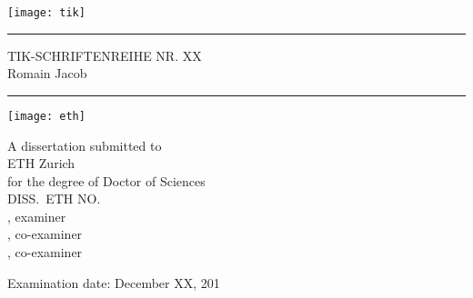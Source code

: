 
\thispagestyle{empty}
\noindent\texttt{[image: tik]}
\medskip
\hrule
\begin{flushright}
\vspace{0.5cm}
TIK-SCHRIFTENREIHE NR. XX \\ \vspace{1cm} 
\large Romain Jacob \\ \vspace{1cm}
\end{flushright}
\begin{flushright}
\Large\bfseries
\titlestringNOBR
\end{flushright}
\vspace{\fill}
\hrule
\bigskip
\texttt{[image: eth]}


\clearpage
\thispagestyle{empty}


\noindent
A dissertation submitted to\\
ETH Zurich\\
for the degree of Doctor of Sciences\\

\noindent DISS.\ ETH NO.\ \dissnumstring\\

\noindent \examinerstring, examiner\\
\coexaminerstringA, co-examiner\\
\coexaminerstringB, co-examiner

\noindent Examination date: December XX, 201\\
\vfill
\noindent
